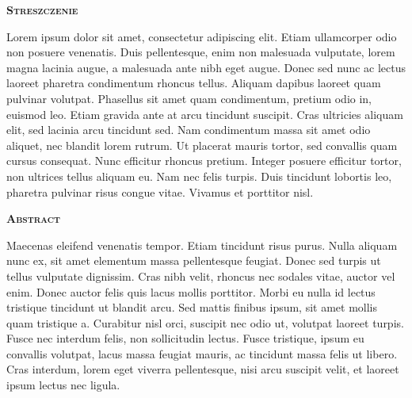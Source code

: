 \newpage
\thispagestyle{empty}

\vspace*{1.5cm}
{	
	\LARGE
	\textsc{\textbf{Streszczenie}}
}
\vspace*{0.5cm}

 Lorem ipsum dolor sit amet, consectetur adipiscing elit. Etiam ullamcorper odio non posuere venenatis. Duis pellentesque, enim non malesuada vulputate, lorem magna lacinia augue, a malesuada ante nibh eget augue. Donec sed nunc ac lectus laoreet pharetra condimentum rhoncus tellus. Aliquam dapibus laoreet quam pulvinar volutpat. Phasellus sit amet quam condimentum, pretium odio in, euismod leo. Etiam gravida ante at arcu tincidunt suscipit. Cras ultricies aliquam elit, sed lacinia arcu tincidunt sed. Nam condimentum massa sit amet odio aliquet, nec blandit lorem rutrum. Ut placerat mauris tortor, sed convallis quam cursus consequat. Nunc efficitur rhoncus pretium. Integer posuere efficitur tortor, non ultrices tellus aliquam eu. Nam nec felis turpis. Duis tincidunt lobortis leo, pharetra pulvinar risus congue vitae. Vivamus et porttitor nisl.

\vspace*{1.5cm}
{
	\LARGE
	\textsc{\textbf{Abstract}}
}
\vspace*{0.5cm}

Maecenas eleifend venenatis tempor. Etiam tincidunt risus purus. Nulla aliquam nunc ex, sit amet elementum massa pellentesque feugiat. Donec sed turpis ut tellus vulputate dignissim. Cras nibh velit, rhoncus nec sodales vitae, auctor vel enim. Donec auctor felis quis lacus mollis porttitor. Morbi eu nulla id lectus tristique tincidunt ut blandit arcu. Sed mattis finibus ipsum, sit amet mollis quam tristique a. Curabitur nisl orci, suscipit nec odio ut, volutpat laoreet turpis. Fusce nec interdum felis, non sollicitudin lectus. Fusce tristique, ipsum eu convallis volutpat, lacus massa feugiat mauris, ac tincidunt massa felis ut libero. Cras interdum, lorem eget viverra pellentesque, nisi arcu suscipit velit, et laoreet ipsum lectus nec ligula.

